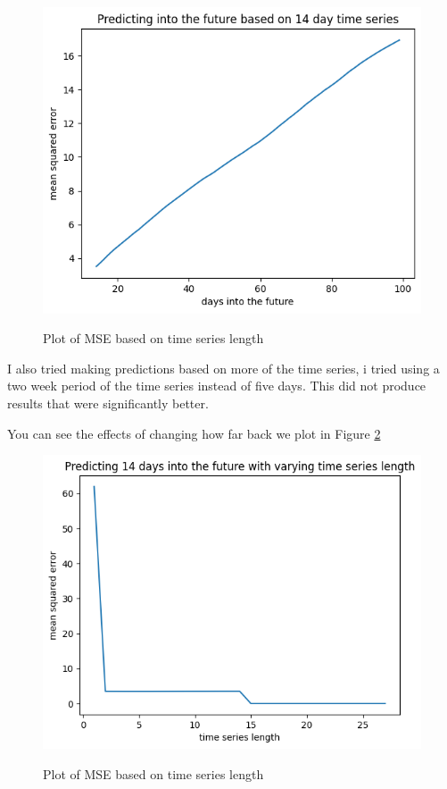 \documentclass{report}
\begin{document}
\begin{figure}
    \caption{Plot of MSE based on time series length}
    \centering
    \includegraphics[scale=0.5]{predicting_into_future_plot.png}
    \label{fig:extrapolation}
\end{figure}

I also tried making predictions based on more of the time series, i tried using a two week period of the time series instead of five days. This did not produce results that were significantly better.

You can see the effects of changing how far back we plot in Figure \ref{fig:vary_time_series_length}

\begin{figure}
    \caption{Plot of MSE based on time series length}
    \centering
    \includegraphics[scale=0.5]{varying_length_plot.png}
    \label{fig:vary_time_series_length}
\end{figure}
\end{document}
